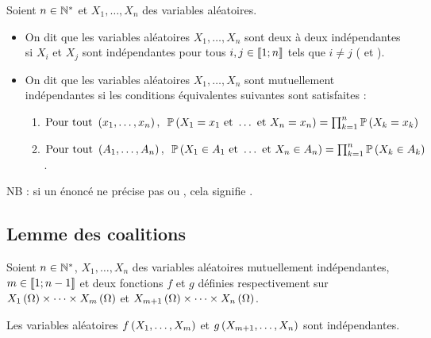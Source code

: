 \begin{defi}
Soient \(n\in\mathbb{N}^*\) et \(X_1,\dots,X_n\) des variables aléatoires.

\begin{itemize}
    \item On dit que les variables aléatoires \(X_1,\dots,X_n\) sont deux à deux indépendantes si \(X_i\) et \(X_j\) sont indépendantes pour tous \(i,j\in\left\llbracket1;n\right\rrbracket\) tels que \(i\not=j\) (\cf {} et ). \\
    \item On dit que les variables aléatoires \(X_1,\dots,X_n\) sont mutuellement indépendantes si les conditions équivalentes suivantes sont satisfaites : \begin{enumerate}
        \item \(\quantifs{\text{Pour tout }\paren{x_1,\dots,x_n}}\proba{X_1=x_1\text{ et }\dots\text{ et }X_n=x_n}=\prod_{k=1}^n\proba{X_k=x_k}\) \\
        \item \(\quantifs{\text{Pour tout }\paren{A_1,\dots,A_n}}\proba{X_1\in A_1\text{ et }\dots\text{ et }X_n\in A_n}=\prod_{k=1}^n\proba{X_k\in A_k}\).
    \end{enumerate}
\end{itemize}

NB : si un énoncé ne précise pas  ou , cela signifie .
\end{defi}

\subsection{Lemme des coalitions}

\begin{lem}
Soient \(n\in\mathbb{N}^*\), \(X_1,\dots,X_n\) des variables aléatoires mutuellement indépendantes, \(m\in\left\llbracket1;n-1\right\rrbracket\) et deux fonctions \(f\) et \(g\) définies respectivement sur \(X_1\left(\Omega\right)\times\dots\times X_m\left(\Omega\right)\) et \(X_{m+1}\left(\Omega\right)\times\dots\times X_n\left(\Omega\right)\).

Les variables aléatoires \(f\left(X_1,\dots,X_m\right)\) et \(g\left(X_{m+1},\dots,X_n\right)\) sont indépendantes.
\end{lem}

